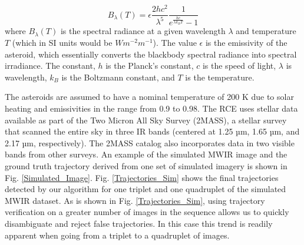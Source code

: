 \begin{equation}
\label{eq:Planck}
B_\lambda(T)= \epsilon	\frac{2hc^2}{\lambda^5} \frac{1}{e^{\frac{hc}{\lambda k_BT}} - 1}
\end{equation}
 where $B_\lambda(T)$ is the spectral radiance at a given wavelength $\lambda$ and temperature $T$ (which in SI units would be $Wm^{-2} m^{-1}$). The value $\epsilon$ is the emissivity of the asteroid, which essentially converts the blackbody spectral radiance into spectral irradiance. The constant, $h$ is the Planck's constant, $c$ is the speed of light, $\lambda$ is wavelength, $k_B$ is the Boltzmann constant, and $T$ is the temperature. 
 
 The asteroids are assumed to have a nominal temperature of 200 K due to solar heating and emissivities in the range from 0.9 to 0.98. 
 The RCE uses stellar data available as part of the Two Micron All Sky Survey (2MASS), a stellar survey that scanned the entire sky in three IR bands (centered at 1.25 µm, 1.65 µm, and 2.17 µm, respectively).  The 2MASS catalog also incorporates data in two visible bands from other surveys. 
 An example of the simulated MWIR image and the ground truth trajectory derived from one set of simulated imagery is shown in Fig. \ref{Simulated_Image}. 
 Fig. \ref{Trajectories_Sim} shows the final trajectories detected by our algorithm for one triplet and one quadruplet of the simulated MWIR dataset. As is shown in Fig. \ref{Trajectories_Sim}, using trajectory verification on a greater number of images in the sequence allows us to quickly disambiguate and reject false trajectories. In this case this trend is readily apparent when going from a triplet to a quadruplet of images.
%

